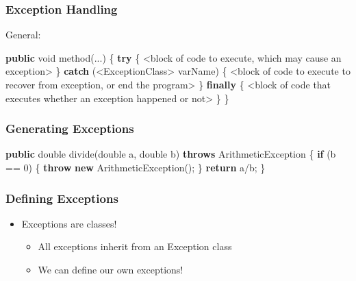 \documentclass[]{article}
\newenvironment{Shaded}{}{}
\newcommand{\BuiltInTok}[1]{#1}
\newcommand{\DataTypeTok}[1]{\textcolor[rgb]{0.56,0.13,0.00}{#1}}
\newcommand{\DecValTok}[1]{\textcolor[rgb]{0.25,0.63,0.44}{#1}}
\newcommand{\FunctionTok}[1]{\textcolor[rgb]{0.02,0.16,0.49}{#1}}
\newcommand{\KeywordTok}[1]{\textcolor[rgb]{0.00,0.44,0.13}{\textbf{#1}}}
\newcommand{\NormalTok}[1]{#1}
\providecommand{\tightlist}{%
  \setlength{\itemsep}{0pt}\setlength{\parskip}{0pt}}
\begin{document}
\hypertarget{exception-handling}{%
\subsubsection{Exception Handling}\label{exception-handling}}

General:

\begin{Shaded}
\begin{Highlighting}[]
\KeywordTok{public} \DataTypeTok{void} \FunctionTok{method}\NormalTok{(...) \{}
    \KeywordTok{try}\NormalTok{ \{}
\NormalTok{        <block of code to execute, which may cause an exception>}
\NormalTok{    \} }\KeywordTok{catch}\NormalTok{ (<ExceptionClass> varName) \{}
\NormalTok{        <block of code to execute to recover from exception, or end the program>}
\NormalTok{    \} }\KeywordTok{finally}\NormalTok{ \{}
\NormalTok{        <block of code that executes whether an exception happened or not>}
\NormalTok{    \}}
\NormalTok{\}}
\end{Highlighting}
\end{Shaded}

\hypertarget{generating-exceptions}{%
\subsubsection{Generating Exceptions}\label{generating-exceptions}}

\begin{Shaded}
\begin{Highlighting}[]
\KeywordTok{public} \DataTypeTok{double} \FunctionTok{divide}\NormalTok{(}\DataTypeTok{double}\NormalTok{ a, }\DataTypeTok{double}\NormalTok{ b) }\KeywordTok{throws} \BuiltInTok{ArithmeticException}\NormalTok{ \{}
    \KeywordTok{if}\NormalTok{ (b == }\DecValTok{0}\NormalTok{) \{}
        \KeywordTok{throw} \KeywordTok{new} \BuiltInTok{ArithmeticException}\NormalTok{();}
\NormalTok{    \}}
    \KeywordTok{return}\NormalTok{ a/b;}
\NormalTok{\}}
\end{Highlighting}
\end{Shaded}

\hypertarget{defining-exceptions}{%
\subsubsection{Defining Exceptions}\label{defining-exceptions}}

\begin{itemize}
\tightlist
\item
  Exceptions are classes!

  \begin{itemize}
  \tightlist
  \item
    All exceptions inherit from an Exception class
  \item
    We can define our own exceptions!
  \end{itemize}
\end{itemize}
\end{document}
